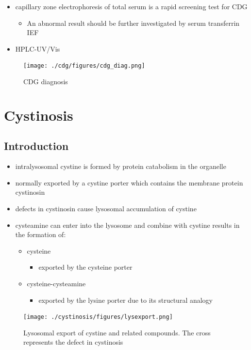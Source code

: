 \documentclass{scrartcl}
\begin{document}
\begin{enumerate}
\begin{itemize}
\item capillary zone electrophoresis of total serum is a rapid screening
test for CDG
\begin{itemize}
\item An abnormal result should be further investigated by serum
transferrin IEF
\end{itemize}
\item HPLC-UV/Vis
\end{itemize}

\begin{figure}[htbp]
\centering
\texttt{[image: ./cdg/figures/cdg\_diag.png]}
\caption{\label{fig:org608327b}
CDG diagnosis}
\end{figure}
\end{enumerate}
\section{Cystinosis}
\label{sec:org18ac7d0}
\subsection{Introduction}
\label{sec:org21af863}
\begin{itemize}
\item intralysosomal cystine is formed by protein catabolism in the organelle
\item normally exported by a cystine porter which contains the membrane protein cystinosin
\item defects in cystinosin cause lysosomal accumulation of cystine
\item cysteamine can enter into the lysosome and combine with cystine results in the formation of:
\begin{itemize}
\item cysteine
\begin{itemize}
\item exported by the cysteine porter
\end{itemize}
\item cysteine-cysteamine
\begin{itemize}
\item exported by the lysine porter due to its structural analogy
\end{itemize}
\end{itemize}
\end{itemize}

\begin{figure}[htbp]
\centering
\texttt{[image: ./cystinosis/figures/lysexport.png]}
\caption{\label{fig:org77845e0}
Lysosomal export of cystine and related compounds. The cross represents the defect in cystinosis}
\end{figure}
\end{document}
